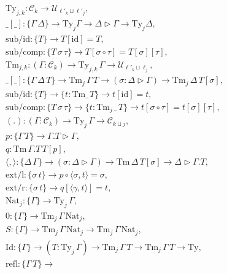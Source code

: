 \[\begin{array}{l}
    \mathrm{Ty}_{j,k}:\mathcal{C}_k\to
        \mathcal{U}_{\ell'_k\sqcup\ell'_j},
    \\
    \_[\_]:\{\Gamma\,\Delta\}\to\mathrm{Ty}_j\Gamma\to
        \Delta\triangleright\Gamma\to
            \mathrm{Ty}_j\Delta,\\
    \mathrm{sub/id}:\{T\}\to T[\mathrm{id}]=T,\\
    \mathrm{sub/comp}:\{T\,\sigma\,\tau\}\to
        T[\sigma\circ\tau]=T[\sigma][\tau],\\
    \mathrm{Tm}_{j,k}:(\Gamma:\mathcal{C}_k)\to
        \mathrm{Ty}_{j,k}\,\Gamma\to\mathcal{U}_{
            \ell'_k\sqcup\ell_j},\\
    \_[\_]:\{\Gamma\,\Delta\,T\}\to
        \mathrm{Tm}_j\,\Gamma\,T\to(\sigma:
        \Delta\triangleright\Gamma)\to
        \mathrm{Tm}_j\,\Delta\,T[\sigma],\\
    \mathrm{sub/id}:\{T\}\to\{t:\mathrm{Tm}\_\,T\}\to
        t[\mathrm{id}]=t,\\
    \mathrm{sub/comp}:\{T\,\sigma\,\tau\}\to
        \{t:\mathrm{Tm}_j\,\_\,T\}\to
        t[\sigma\circ\tau]=t[\sigma][\tau],\\
    (.):(\Gamma:\mathcal{C}_k)\to\mathrm{Ty}_j\,
        \Gamma\to\mathcal{C}_{k\sqcup j},\\
    p:\{\Gamma\,T\}\to\Gamma.T\triangleright\Gamma,\\
    q:\mathrm{Tm}\,\Gamma.T\,T[p],\\
    \langle,\rangle:\{\Delta\,\Gamma\}\to
        (\sigma:\Delta\triangleright\Gamma)\to
        \mathrm{Tm}\,\Delta\,T[\sigma]\to
        \Delta\triangleright\Gamma.T,\\
    \mathrm{ext/l}:\{\sigma\,t\}\to
        p\circ\langle\sigma, t\rangle=\sigma,\\
    \mathrm{ext/r}:\{\sigma\,t\}\to
        q[\langle \gamma, t\rangle]=t,\\
    \mathrm{Nat}_j:\{\Gamma\}\to\mathrm{Ty}_j\,
        \Gamma,\\
    0:\{\Gamma\}\to\mathrm{Tm}_j\,\Gamma\,
        \mathrm{Nat}_j,\\
    S:\{\Gamma\}\to\mathrm{Tm}_j\,\Gamma\,
        \mathrm{Nat}_j\to\mathrm{Tm}_j\,\Gamma
            \,\mathrm{Nat}_j,\\
    \mathrm{Id}:\{\Gamma\}\to(T:\mathrm{Ty}_j\,\Gamma)
        \to\mathrm{Tm}_j\,\Gamma\,T
        \to\mathrm{Tm}_j\,\Gamma\,T
        \to\mathrm{Ty},\\
    \mathrm{refl}:\{\Gamma\,T\}\to

\end{array}\]
